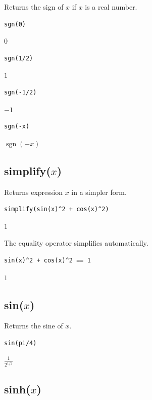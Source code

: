 \documentclass[12pt]{article}
\begin{document}
Returns the sign of $x$ if $x$ is a real number.

{\color{blue}
\begin{verbatim}
sgn(0)
\end{verbatim}
}

$0$

{\color{blue}
\begin{verbatim}
sgn(1/2)
\end{verbatim}
}

$1$

{\color{blue}
\begin{verbatim}
sgn(-1/2)
\end{verbatim}
}

$-1$

{\color{blue}
\begin{verbatim}
sgn(-x)
\end{verbatim}
}

$\operatorname{sgn}(-x)$

\subsection*{simplify($x$)}

Returns expression $x$ in a simpler form.

{\color{blue}
\begin{verbatim}
simplify(sin(x)^2 + cos(x)^2)
\end{verbatim}
}

$1$

\bigskip
The equality operator simplifies automatically.

{\color{blue}
\begin{verbatim}
sin(x)^2 + cos(x)^2 == 1
\end{verbatim}
}

$1$

\subsection*{sin($x$)}

Returns the sine of $x$.

{\color{blue}
\begin{verbatim}
sin(pi/4)
\end{verbatim}
}

$\displaystyle \frac{1}{2^{1/2}}$

\subsection*{sinh($x$)}
\end{document}
